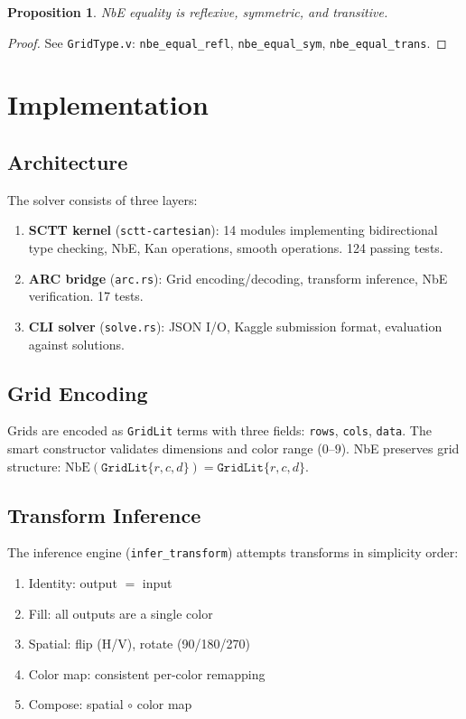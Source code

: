 \documentclass[11pt,a4paper]{article}
\newtheorem{proposition}[theorem]{Proposition}
\newcommand{\NbE}{\mathrm{NbE}}
\begin{document}
\begin{proposition}
NbE equality is reflexive, symmetric, and transitive.
\end{proposition}
\begin{proof}
See \texttt{GridType.v}: \texttt{nbe\_equal\_refl},
\texttt{nbe\_equal\_sym}, \texttt{nbe\_equal\_trans}.
\end{proof}

\section{Implementation}
\label{sec:impl}

\subsection{Architecture}

The solver consists of three layers:
\begin{enumerate}[nosep]
  \item \textbf{SCTT kernel} (\texttt{sctt-cartesian}): 14 modules
    implementing bidirectional type checking, NbE, Kan operations,
    smooth operations.  124 passing tests.
  \item \textbf{ARC bridge} (\texttt{arc.rs}): Grid encoding/decoding,
    transform inference, NbE verification.  17 tests.
  \item \textbf{CLI solver} (\texttt{solve.rs}): JSON I/O, Kaggle
    submission format, evaluation against solutions.
\end{enumerate}

\subsection{Grid Encoding}

Grids are encoded as \texttt{GridLit} terms with three fields:
\texttt{rows}, \texttt{cols}, \texttt{data}.  The smart constructor
validates dimensions and color range ($0$--$9$).  NbE preserves grid
structure: $\NbE(\texttt{GridLit}\{r,c,d\}) = \texttt{GridLit}\{r,c,d\}$.

\subsection{Transform Inference}

The inference engine (\texttt{infer\_transform}) attempts transforms
in simplicity order:
\begin{enumerate}[nosep]
  \item Identity: output $=$ input
  \item Fill: all outputs are a single color
  \item Spatial: flip (H/V), rotate (90/180/270)
  \item Color map: consistent per-color remapping
  \item Compose: spatial $\circ$ color map
\end{enumerate}
\end{document}
